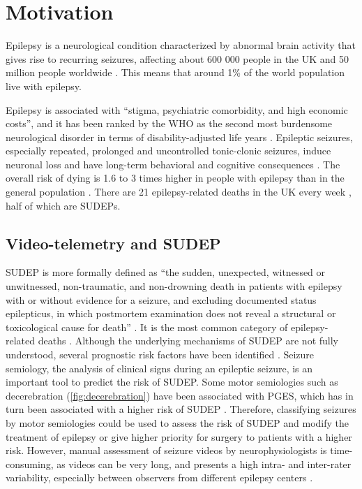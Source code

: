 \section{Motivation}

Epilepsy is a neurological condition characterized by abnormal brain activity that gives rise to recurring seizures, affecting about 600 000 people in the UK and 50 million people worldwide \cite{nice_epilepsies_2012,fiest_prevalence_2017}.
This means that around 1\% of the world population live with epilepsy.

Epilepsy is associated with ``stigma, psychiatric comorbidity, and high economic costs'', and it has been ranked by the \ac{WHO} as the second most burdensome neurological disorder in terms of disability-adjusted life years \cite{fiest_prevalence_2017}.
Epileptic seizures, especially repeated, prolonged and uncontrolled tonic-clonic seizures, induce neuronal loss and have long-term behavioral and cognitive consequences \cite{sutula_epileptic_2003}.
The overall risk of dying is 1.6 to 3 times higher in people with epilepsy than in the general population \cite{forsgren_mortality_2005}.
There are 21 epilepsy-related deaths in the UK every week%
,
half of which are \acp{SUDEP}.  %


\subsection{Video-telemetry and SUDEP}

\ac{SUDEP} is more formally defined as ``the sudden, unexpected, witnessed or unwitnessed, non-traumatic, and non-drowning death in patients with epilepsy with or without evidence for a seizure, and excluding documented status epilepticus, in which postmortem examination does not reveal a structural or toxicological cause for death'' \cite{nashef_sudden_1997}.
It is the most common category of epilepsy-related deaths \cite{devinsky_sudden_2016}.
Although the underlying mechanisms of \ac{SUDEP} are not fully understood, several prognostic risk factors have been identified \cite{so_what_2008, jha_sudden_2021}.
Seizure semiology, the analysis of clinical signs during an epileptic seizure, is an important tool to predict the risk of \ac{SUDEP}.
Some motor semiologies such as decerebration (\cref{fig:decerebration}) have been associated with \ac{PGES}, which has in turn been associated with a higher risk of \ac{SUDEP} \cite{alexandre_risk_2015,vilella_association_2021}.
Therefore, classifying seizures by motor semiologies could be used to assess the risk of \ac{SUDEP} and modify the treatment of epilepsy or give higher priority for surgery to patients with a higher risk.
However, manual assessment of seizure videos by neurophysiologists is time-consuming, as videos can be very long, and presents a high intra- and inter-rater variability, especially between observers from different epilepsy centers \cite{tufenkjian_seizure_2012}.

